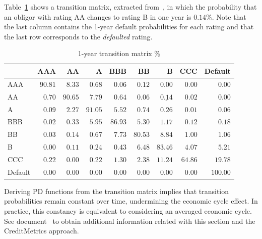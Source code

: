 \documentclass[11pt,fleqn]{book} %
\begin{document}
\begin{example}
	\label{ex:1ytm}
	Table~\ref{tmatrix1} shows a transition matrix, extracted 
	from~\cite[p. 20]{cmetrics:1997}, in which the probability that an obligor 
	with rating AA changes to rating B in one year is $0.14\%$. Note that the
	last column contains the 1-year default probabilities for each rating and 
	that the last row corresponds to the \emph{defaulted} rating.
\end{example}

\begin{table}[!ht]
	\begin{center}
		\begin{tabular}[]{l|rrrrrrrr}
							& AAA     & AA      & A       & BBB     & BB      & B                  & CCC     & Default  \\
			\hline
			AAA     & $90.81$ & $8.33$  & $0.68$  & $0.06$  & $0.12$  & $0.00$             & $0.00$  & $0.00$   \\
			AA      & $0.70$  & $90.65$ & $7.79$  & $0.64$  & $0.06$  & $\underline{0.14}$ & $0.02$  & $0.00$   \\
			A       & $0.09$  & $2.27$  & $91.05$ & $5.52$  & $0.74$  & $0.26$             & $0.01$  & $0.06$   \\
			BBB     & $0.02$  & $0.33$  & $5.95$  & $86.93$ & $5.30$  & $1.17$             & $0.12$  & $0.18$   \\
			BB      & $0.03$  & $0.14$  & $0.67$  & $7.73$  & $80.53$ & $8.84$             & $1.00$  & $1.06$   \\
			B       & $0.00$  & $0.11$  & $0.24$  & $0.43$  & $6.48$  & $83.46$            & $4.07$  & $5.21$   \\
			CCC     & $0.22$  & $0.00$  & $0.22$  & $1.30$  & $2.38$  & $11.24$            & $64.86$ & $19.78$  \\
			Default & $0.00$  & $0.00$  & $0.00$  & $0.00$  & $0.00$  & $0.00$             & $0.00$  & $100.00$ \\
		\end{tabular}
		\caption{1-year transition matrix \%}
		\label{tmatrix1}
	\end{center}
\end{table}

Deriving PD functions from the transition matrix implies that transition 
probabilities remain constant over time, undermining the economic cycle 
effect. In practice, this constancy is equivalent to considering an averaged 
economic cycle. See document~\cite[sec. 3.2.1]{bindseil:2007} to obtain 
additional information related with this section and the 
CreditMetrics\texttrademark{} approach.
\end{document}
